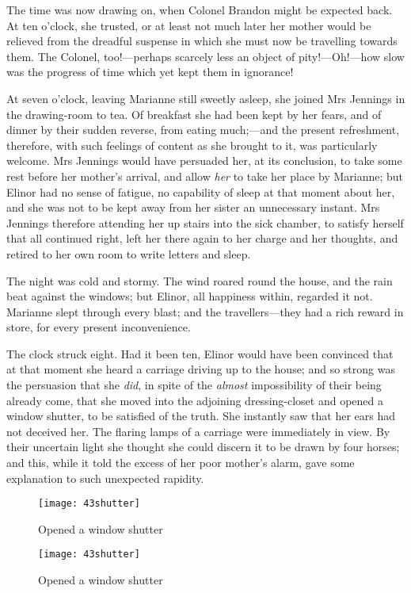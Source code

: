The time was now drawing on, when Colonel Brandon might be expected back. At ten o’clock, she trusted, or at least not much later her mother would be relieved from the dreadful suspense in which she must now be travelling towards them. The Colonel, too!—perhaps scarcely less an object of pity!—Oh!—how slow was the progress of time which yet kept them in ignorance!

At seven o’clock, leaving Marianne still sweetly asleep, she joined Mrs Jennings in the drawing-room to tea. Of breakfast she had been kept by her fears, and of dinner by their sudden reverse, from eating much;—and the present refreshment, therefore, with such feelings of content as she brought to it, was particularly welcome. Mrs Jennings would have persuaded her, at its conclusion, to take some rest before her mother’s arrival, and allow \textit{her} to take her place by Marianne; but Elinor had no sense of fatigue, no capability of sleep at that moment about her, and she was not to be kept away from her sister an unnecessary instant. Mrs Jennings therefore attending her up stairs into the sick chamber, to satisfy herself that all continued right, left her there again to her charge and her thoughts, and retired to her own room to write letters and sleep.

The night was cold and stormy. The wind roared round the house, and the rain beat against the windows; but Elinor, all happiness within, regarded it not. Marianne slept through every blast; and the travellers—they had a rich reward in store, for every present inconvenience.

The clock struck eight. Had it been ten, Elinor would have been convinced that at that moment she heard a carriage driving up to the house; and so strong was the persuasion that she \textit{did}, in spite of the \textit{almost} impossibility of their being already come, that she moved into the adjoining dressing-closet and opened a window shutter, to be satisfied of the truth. She instantly saw that her ears had not deceived her. The flaring lamps of a carriage were immediately in view. By their uncertain light she thought she could discern it to be drawn by four horses; and this, while it told the excess of her poor mother’s alarm, gave some explanation to such unexpected rapidity.



\makeatletter
{}
{%
\begin{figure}[tbph]
	\centering
\texttt{[image: 43shutter]}
\caption{Opened a window shutter}
\end{figure}
}{%
\begin{figure}[tbph]
\centering
\texttt{[image: 43shutter]}
\caption{Opened a window shutter}
\end{figure}
}
\makeatother

